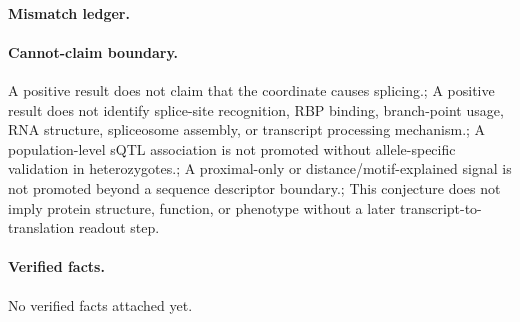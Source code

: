 \paragraph{Mismatch ledger.}
\paragraph{Cannot-claim boundary.} A positive result does not claim that the coordinate causes splicing.; A positive result does not identify splice-site recognition, RBP binding, branch-point usage, RNA structure, spliceosome assembly, or transcript processing mechanism.; A population-level sQTL association is not promoted without allele-specific validation in heterozygotes.; A proximal-only or distance/motif-explained signal is not promoted beyond a sequence descriptor boundary.; This conjecture does not imply protein structure, function, or phenotype without a later transcript-to-translation readout step.

\paragraph{Verified facts.}
No verified facts attached yet.
